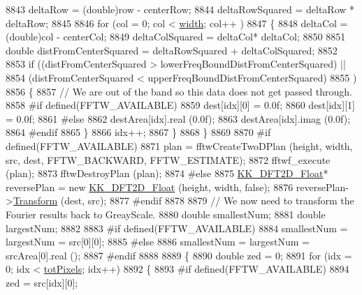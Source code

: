 \begin{DoxyCode}
8843     deltaRow = (double)row - centerRow;
8844     deltaRowSquared = deltaRow * deltaRow;
8845 
8846     \textcolor{keywordflow}{for} (col = 0; col < \hyperlink{class_k_k_b_1_1_raster_ae0bcc103e191c3421d7692dc69ceb554}{width}; col++ )
8847     \{     
8848       deltaCol = (double)col - centerCol;
8849       deltaColSquared = deltaCol* deltaCol;
8850 
8851       \textcolor{keywordtype}{double}  distFromCenterSquared = deltaRowSquared + deltaColSquared;
8852 
8853       \textcolor{keywordflow}{if}  ((distFromCenterSquared > lowerFreqBoundDistFromCenterSquared)  ||
8854            (distFromCenterSquared < upperFreqBoundDistFromCenterSquared)
8855           )
8856       \{
8857         \textcolor{comment}{// We are out of the band so this data does not get passed through.}
8858 \textcolor{preprocessor}{        #if  defined(FFTW\_AVAILABLE)}
8859           dest[idx][0] = 0.0f;
8860           dest[idx][1] = 0.0f;
8861 \textcolor{preprocessor}{        #else}
8862           destArea[idx].real (0.0f);
8863           destArea[idx].imag (0.0f);
8864 \textcolor{preprocessor}{        #endif}
8865       \}
8866       idx++;
8867     \}
8868   \}
8869 
8870 \textcolor{preprocessor}{  #if  defined(FFTW\_AVAILABLE)}
8871     plan = fftwCreateTwoDPlan (height, width, src, dest, FFTW\_BACKWARD, FFTW\_ESTIMATE);
8872     fftwf\_execute (plan);
8873     fftwDestroyPlan (plan);
8874 \textcolor{preprocessor}{  #else}
8875     \hyperlink{class_k_k_b_1_1_k_k___d_f_t2_d}{KK\_DFT2D\_Float}*  reversePlan = \textcolor{keyword}{new} \hyperlink{namespace_k_k_b_a7de386112eca309c8ef4daddd5b64c8b}{KK\_DFT2D\_Float} (height, width, \textcolor{keyword}{false});
8876     reversePlan->\hyperlink{class_k_k_b_1_1_k_k___d_f_t2_d_aa9bdc656e7af618c93047386e374e11b}{Transform} (dest, src);
8877 \textcolor{preprocessor}{  #endif}
8878 
8879   \textcolor{comment}{// We now need to transform the Fourier results back to GreayScale.}
8880   \textcolor{keywordtype}{double}  smallestNum;
8881   \textcolor{keywordtype}{double}  largestNum;
8882 
8883 \textcolor{preprocessor}{  #if  defined(FFTW\_AVAILABLE)}
8884     smallestNum = largestNum = src[0][0];
8885 \textcolor{preprocessor}{  #else}
8886     smallestNum = largestNum = srcArea[0].real ();
8887 \textcolor{preprocessor}{  #endif}
8888 
8889   \{
8890     \textcolor{keywordtype}{double}  zed = 0;
8891     \textcolor{keywordflow}{for} (idx = 0;  idx < \hyperlink{class_k_k_b_1_1_raster_a9b08c4a0ca0a35435a478599635f1dc0}{totPixels};  idx++)
8892     \{
8893 \textcolor{preprocessor}{      #if  defined(FFTW\_AVAILABLE)}
8894         zed = src[idx][0];

\end{DoxyCode}
